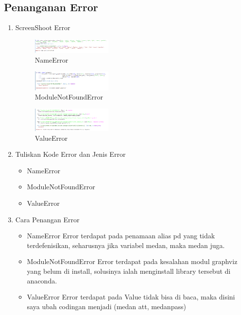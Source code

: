 \subsection{Penanganan Error}
\begin{enumerate}
	\item ScreenShoot Error
	\begin{figure}[H]
		\includegraphics[width=4cm]{figures/1174021/tugas2/error/1.PNG}
		\centering
		\caption{NameError}
	\end{figure}
	\begin{figure}[H]
		\includegraphics[width=4cm]{figures/1174021/tugas2/error/2.PNG}
		\centering
		\caption{ModuleNotFoundError}
	\end{figure}
	\begin{figure}[H]
		\includegraphics[width=4cm]{figures/1174021/tugas2/error/3.PNG}
		\centering
		\caption{ValueError}
	\end{figure}
	\item Tuliskan Kode Error dan Jenis Error
	\begin{itemize}
		\item NameError
		\item ModuleNotFoundError
		\item ValueError
	\end{itemize}
	\item Cara Penangan Error
	\begin{itemize}
		\item NameError
		\hfill\break
		Error terdapat pada penamaan alias pd yang tidak terdefenisikan, seharusnya jika variabel medan, maka medan juga.
		\item ModuleNotFoundError
		\hfill\break
		Error terdapat pada kesalahan modul graphviz yang belum di install, solusinya ialah menginstall library tersebut di anaconda.
		\item ValueError
		\hfill\break
		Error terdapat pada Value tidak bisa di baca, maka disini saya ubah codingan menjadi (medan att, medanpass)
	\end{itemize}
\end{enumerate}
